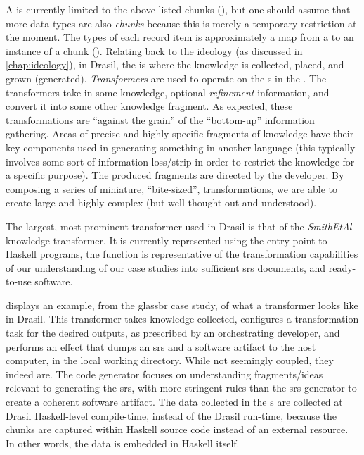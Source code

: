 A \ChunkDB{} is currently limited to the above listed chunks
(), but one should assume that more data types are
also \textit{chunks} because this is merely a temporary restriction at the
moment. The types of each record item is approximately a map from a \UID{} to an
instance of a chunk (). Relating back to the
ideology (as discussed in \autoref{chap:ideology}), in Drasil, the \ChunkDB{} is
where the knowledge is collected, placed, and grown (generated).
\textit{Transformers} are used to operate on the \Chunk{}s in the \ChunkDB{}.
The transformers take in some knowledge, optional \textit{refinement}
information, and convert it into some other knowledge fragment. As expected,
these transformations are ``against the grain'' of the ``bottom-up'' information
gathering. Areas of precise and highly
specific fragments of knowledge have their key components used in generating
something in another language (this typically involves some sort of information
loss/strip in order to restrict the knowledge for a specific purpose). The
produced fragments are directed by the developer. By composing a series of
miniature, ``bite-sized'', transformations, we are able to create large and
highly complex (but well-thought-out and understood).

The largest, most prominent transformer used in Drasil is that of the
\textit{SmithEtAl} knowledge transformer. It is currently represented using the entry point to Haskell
programs, the  function is representative of the
transformation capabilities of our understanding of our case studies into
sufficient \acs{srs} documents, and ready-to-use software.

\currentGlassBRMainFHaskell{}

 displays an example, from the \acs{glassbr} case
study, of what a transformer looks like in Drasil. This transformer takes
knowledge collected, configures a transformation task for the desired outputs,
as prescribed by an orchestrating developer, and performs an 
effect that dumps an \acs{srs} and a software artifact to the host computer, in
the local working directory. While not seemingly coupled, they indeed are. The
code generator focuses on understanding fragments/ideas relevant to generating
the \acs{srs}, with more stringent rules than the \acs{srs} generator to create
a coherent software artifact. The data collected in the \ChunkDB{}s are
collected at Drasil Haskell-level compile-time, instead of the Drasil run-time,
because the chunks are captured within Haskell source code instead of an
external resource. In other words, the data is embedded in Haskell itself.

